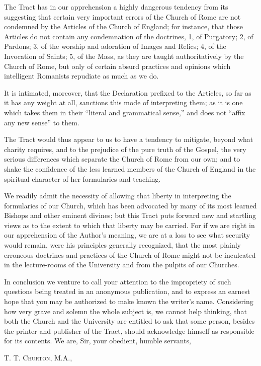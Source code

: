 The Tract has in our apprehension a highly dangerous tendency from
its suggesting that certain very important errors of the Church of
Rome are not condemned by the Articles of the Church of England; for
instance, that those Articles do not contain any condemnation of the
doctrines, 1, of Purgatory; 2, of Pardons; 3, of the worship and
adoration of Images and Relics; 4, of the Invocation of Saints; 5, of
the Mass, as they are taught authoritatively by the Church of Rome,
but only of certain absurd practices and opinions which intelligent
Romanists repudiate as much as we do.

It is intimated, moreover, that the Declaration prefixed to the
Articles, so far as it has any weight at all, sanctions this mode of
interpreting them; as it is one which takes them in their
``literal and grammatical sense,'' and does not ``affix
any new sense'' to them.

The Tract would thus appear to us to have a tendency to
mitigate, beyond what charity requires, and to the prejudice of the
pure truth of the Gospel, the very serious differences which separate
the Church of Rome from our own; and to shake the confidence of the
less learned members of the Church of England in the spiritual
character of her formularies and teaching.

We readily admit the necessity of allowing that liberty in
interpreting the formularies of our Church, which has been advocated
by many of its most learned Bishops and other eminent divines; but
this Tract puts forward new and startling views as to the extent to
which that liberty may be carried. For if we are right in our
apprehension of the Author's meaning, we are at a loss to see what
security would remain, were his principles generally recognized, that
the most plainly erroneous doctrines and practices of the Church of
Rome might not be inculcated in the lecture-rooms of the University
and from the pulpits of our Churches.

In conclusion we venture to call your attention to the impropriety
of such questions being treated in an anonymous publication, and to
express an earnest hope that you may be authorized to make known the
writer's name. Considering how very grave and solemn the whole subject
is, we cannot help thinking, that both the Church and the University
are entitled to ask that some person, besides the printer and
publisher of the Tract, should acknowledge himself as responsible for
its contents. We are, Sir, your obedient, humble servants,

T. T. C\textsc{hurton}, M.A.,

